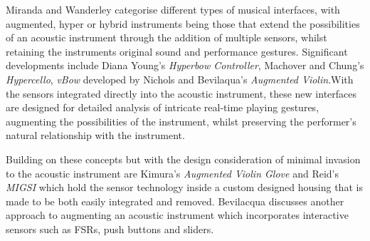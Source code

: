 \documentclass{nime-alternate}
\begin{document}
Miranda and Wanderley categorise different types of musical interfaces, with augmented, hyper or hybrid instruments being those that extend the possibilities of an acoustic instrument through the addition of multiple sensors, whilst retaining the instruments original sound and performance gestures\cite{miranda:new}. Significant developments include Diana Young's \textit{Hyperbow Controller}\cite{young:hyperbow}\cite{young:classification},
Machover and Chung's \textit{Hypercello}\cite{levenson:taming}\cite{paradiso:musical}, \textit{vBow} developed by Nichols\cite{nichols:vbow} and Bevilaqua's \textit{Augmented Violin}\cite{bevilacqua:augmented}.With the sensors integrated directly into the acoustic instrument, these new interfaces are designed for detailed analysis of intricate real-time playing gestures\cite{bevilacqua:augmented}, augmenting the possibilities of the instrument, whilst preserving the performer's natural relationship with the instrument.


Building on these concepts but with the design consideration of minimal invasion to the acoustic instrument are Kimura's \textit{Augmented Violin Glove}\cite{kimura:extracting} and Reid's \textit{MIGSI}\cite{Reid:2016} which hold the sensor technology inside a custom designed housing that is made to be both easily integrated and removed. Bevilacqua discusses another approach to augmenting an acoustic instrument which incorporates interactive sensors such as FSRs, push buttons and sliders\cite{bevilacqua:augmented}. 
\end{document}
